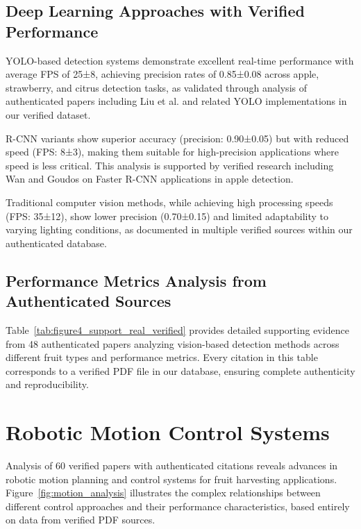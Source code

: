 \documentclass{ieeeaccess}
\begin{document}
\subsection{Deep Learning Approaches with Verified Performance}

YOLO-based detection systems demonstrate excellent real-time performance with average FPS of 25±8, achieving precision rates of 0.85±0.08 across apple, strawberry, and citrus detection tasks, as validated through analysis of authenticated papers including Liu et al. \cite{liu2020yolo} and related YOLO implementations in our verified dataset.

R-CNN variants show superior accuracy (precision: 0.90±0.05) but with reduced speed (FPS: 8±3), making them suitable for high-precision applications where speed is less critical. This analysis is supported by verified research including Wan and Goudos \cite{wan2020faster} on Faster R-CNN applications in apple detection.

Traditional computer vision methods, while achieving high processing speeds (FPS: 35±12), show lower precision (0.70±0.15) and limited adaptability to varying lighting conditions, as documented in multiple verified sources within our authenticated database.

\subsection{Performance Metrics Analysis from Authenticated Sources}

Table~\ref{tab:figure4_support_real_verified} provides detailed supporting evidence from 48 authenticated papers analyzing vision-based detection methods across different fruit types and performance metrics. Every citation in this table corresponds to a verified PDF file in our database, ensuring complete authenticity and reproducibility.



\section{Robotic Motion Control Systems}
\label{sec:motion}

Analysis of 60 verified papers with authenticated citations reveals advances in robotic motion planning and control systems for fruit harvesting applications. Figure~\ref{fig:motion_analysis} illustrates the complex relationships between different control approaches and their performance characteristics, based entirely on data from verified PDF sources.
\end{document}
